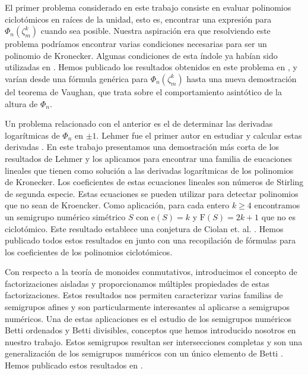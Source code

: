 El primer problema considerado en este trabajo consiste en evaluar polinomios ciclotómicos en raíces de la unidad, esto es, encontrar una expresión para $\Phi_n(\zeta_m^k)$ cuando sea posible. Nuestra aspiración era que resolviendo este problema podríamos encontrar varias condiciones necesarias para ser un polinomio de Kronecker. Algunas condiciones de esta índole ya habían sido utilizadas en \cite{cyclotmic}. Hemos publicado los resultados obtenidos en este problema en \cite{cyclo:roots-unity}, y varían desde una fórmula genérica para $\Phi_n(\zeta_m^k)$ hasta una nueva demostración del teorema de Vaughan, que trata sobre el comportamiento asintótico de la altura de $\Phi_n$.

Un problema relacionado con el anterior es el de determinar las derivadas logarítmicas de $\Phi_n$ en $\pm1$. Lehmer fue el primer autor en estudiar y calcular estas derivadas \cite{Lehmer}. En este trabajo presentamos una demostración más corta de los resultados de Lehmer y los aplicamos para encontrar una familia de eucaciones lineales que tienen como solución a las derivadas logarítmicas de los polinomios de Kronecker. Los coeficientes de estas ecuaciones lineales son números de Stirling de segunda especie. Estas ecuaciones se pueden utilizar para detectar polinomios que no sean de Kroencker. Como aplicación, para cada entero $k \ge 4$ encontramos un semigrupo numérico simétrico $S$ con $\mathrm{e}(S) = k$ y $\mathrm{F}(S) = 2k+1$ que no es ciclotómico. Este resultado establece una conjetura de Ciolan et. al. \cite[Conjetura 2]{cyclotomic}. Hemos publicado todos estos resultados en \cite{cyclo:log-deriv} junto con una recopilación de fórmulas para los coeficientes de los polinomios ciclotómicos.

Con respecto a la teoría de monoides conmutativos, introducimos el concepto de factorizaciones aisladas y proporcionamos múltiples propiedades de estas factorizaciones. Estos resultados nos permiten caracterizar varias familias de semigrupos afines y son particularmente interesantes al aplicarse a semigrupos numéricos. Una de estas aplicaciones es el estudio de los semigrupos numéricos Betti ordenados y Betti divisibles, conceptos que hemos introducido nosotros en nuestro trabajo. Estos semigrupos resultan ser intersecciones completas y son una generalización de los semigrupos numéricos con un único elemento de Betti \cite{single-betti}. Hemos publicado estos resultados en \cite{isolated}.

